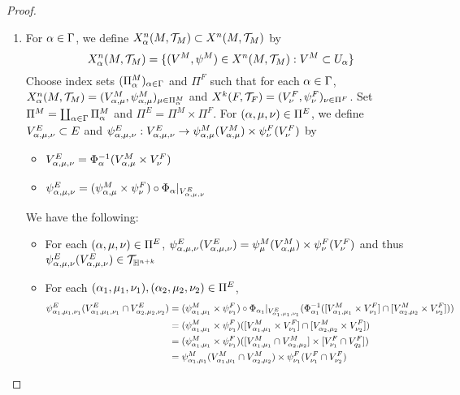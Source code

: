 \documentclass{book}
\begin{document}
	\begin{proof}\
		\begin{enumerate}
			\item For $\alpha \in \Gamma$, we define $X^n_{\alpha}(M, \mathcal{T}_M) \subset X^n(M, \mathcal{T}_M)$ by 
			$$X^n_{\alpha}(M, \mathcal{T}_M) = \{(V^M, \psi^M) \in X^n(M, \mathcal{T}_M): V^M \subset U_{\alpha}\}$$ 
			Choose index sets $(\Pi_{\alpha}^M)_{\alpha \in \Gamma}$ and $\Pi^F$ such that for each $\alpha \in \Gamma$, $X^n_{\alpha}(M, \mathcal{T}_M) = (V^M_{\alpha, \mu}, \psi^M_{\alpha, \mu})_{\mu \in \Pi^M_{\alpha}}$ and $X^k(F, \mathcal{T}_F) = (V^F_{\nu}, \psi^F_{\nu})_{\nu \in \Pi^F}$. Set $\Pi^M = \coprod_{\alpha \in \Gamma} \Pi_{\alpha}^M$ and $\Pi^E = \Pi^M \times \Pi^F$. For $(\alpha, \mu, \nu) \in \Pi^E$, we define $V^E_{\alpha, \mu, \nu} \subset E$ and $\psi^E_{\alpha, \mu, \nu}: V^E_{\alpha, \mu, \nu} \rightarrow \psi^M_{\alpha, \mu}(V^M_{\alpha, \mu}) \times \psi^F_{\nu}(V^F_{\nu})$ by 
			\begin{itemize}
				\item $V^E_{\alpha, \mu, \nu} = \Phi_{\alpha}^{-1}(V^M_{\alpha, \mu} \times V^F_{\nu})$ 
				\item $\psi^E_{\alpha, \mu, \nu} = (\psi^M_{\alpha, \mu} \times \psi^F_{\nu}) \circ \Phi_{\alpha}|_{V^E_{\alpha, \mu, \nu}}$
			\end{itemize}
			We have the following:
			\begin{itemize}
				\item For each $(\alpha, \mu, \nu) \in \Pi^E$, $\psi^E_{\alpha, \mu, \nu}(V^E_{\alpha, \mu, \nu}) = \psi^M_{\mu}(V^M_{\alpha, \mu}) \times \psi^F_{\nu}(V^F_{\nu})$ and thus $\psi^E_{\alpha, \mu, \nu}(V^E_{\alpha, \mu, \nu}) \in \mathcal{T}_{\mathbb{H}^{n + k}}$ 
				\item For each $(\alpha_1, \mu_1, \nu_1), (\alpha_2, \mu_2, \nu_2) \in \Pi^E$,
				\begin{align*}
					\psi^E_{\al_1, \mu_1, \nu_1}(V^E_{\al_1, \mu_1, \nu_1} \cap V^E_{\al_2, \mu_2, \nu_2}) 
					& = (\psi^M_{\al_1, \mu_1} \times \psi^F_{\nu_1}) \circ \Phi_{\al_1}|_{V^E_{\al_1, \mu_1, \nu_1}} (\Phi_{\al_1}^{-1}([V^M_{\al_1, \mu_1} \times V^F_{\nu_1}] \cap [V^M_{\al_2, \mu_2} \times V^F_{\nu_2}])) \\
					& = (\psi^M_{\al_1, \mu_1} \times \psi^F_{\nu_1})([V^M_{\al_1, \mu_1} \times V^F_{\nu_1}] \cap [V^M_{\al_2, \mu_2} \times V^F_{\nu_2}]) \\
					& = (\psi_{\al_1, \mu_1}^M \times \psi_{\nu_1}^F)([V^M_{\al_1, \mu_1} \cap V^M_{\al_2, \mu_2}] \times [V^F_{\nu_1} \cap V^F_{q_2}]) \\
					& = \psi_{\al_1, \mu_1}^M (V^M_{\al_1, \mu_1} \cap V^M_{\al_2, \mu_2}) \times \psi_{\nu_1}^F(V^F_{\nu_1} \cap V^F_{\nu_2}) \\

\end{align*}
\end{itemize}
\end{enumerate}
\end{proof}
\end{document}
